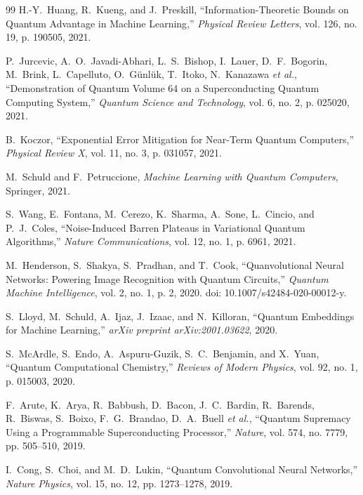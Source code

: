 \documentclass[journal]{IEEEtran}
\begin{document}
\begin{thebibliography}{99}
H.-Y.~Huang, R.~Kueng, and J.~Preskill,
``Information-Theoretic Bounds on Quantum Advantage in Machine Learning,''
\emph{Physical Review Letters}, vol. 126, no. 19,
p. 190505, 2021.

P.~Jurcevic, A.~O.~Javadi-Abhari, L.~S.~Bishop, I.~Lauer,
D.~F.~Bogorin, M.~Brink, L.~Capelluto, O.~G{\"u}nl{\"u}k,
T.~Itoko, N.~Kanazawa \emph{et al.},
``Demonstration of Quantum Volume 64 on a Superconducting Quantum Computing System,''
\emph{Quantum Science and Technology}, vol. 6, no. 2,
p. 025020, 2021.

B.~Koczor,
``Exponential Error Mitigation for Near-Term Quantum Computers,''
\emph{Physical Review X}, vol. 11, no. 3, p. 031057, 2021.

M.~Schuld and F.~Petruccione,
\emph{Machine Learning with Quantum Computers},
Springer, 2021.

S.~Wang, E.~Fontana, M.~Cerezo, K.~Sharma, A.~Sone,
L.~Cincio, and P.~J.~Coles,
``Noise-Induced Barren Plateaus in Variational Quantum Algorithms,''
\emph{Nature Communications}, vol. 12, no. 1, p. 6961, 2021.

M.~Henderson, S.~Shakya, S.~Pradhan, and T.~Cook,
``Quanvolutional Neural Networks: Powering Image Recognition with Quantum Circuits,''
\emph{Quantum Machine Intelligence}, vol. 2, no. 1, p. 2, 2020.
doi: 10.1007/s42484-020-00012-y.

S.~Lloyd, M.~Schuld, A.~Ijaz, J.~Izaac, and N.~Killoran,
``Quantum Embeddings for Machine Learning,''
\emph{arXiv preprint arXiv:2001.03622}, 2020.

S.~McArdle, S.~Endo, A.~Aspuru-Guzik, S.~C.~Benjamin,
and X.~Yuan,
``Quantum Computational Chemistry,''
\emph{Reviews of Modern Physics}, vol. 92, no. 1,
p. 015003, 2020.

F.~Arute, K.~Arya, R.~Babbush, D.~Bacon, J.~C.~Bardin,
R.~Barends, R.~Biswas, S.~Boixo, F.~G.~Brandao,
D.~A.~Buell \emph{et al.},
``Quantum Supremacy Using a Programmable Superconducting Processor,''
\emph{Nature}, vol. 574, no. 7779,
pp. 505--510, 2019.

I.~Cong, S.~Choi, and M.~D.~Lukin,
``Quantum Convolutional Neural Networks,''
\emph{Nature Physics}, vol. 15, no. 12,
pp. 1273--1278, 2019.


\end{thebibliography}
\end{document}
